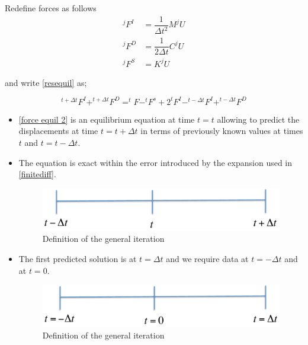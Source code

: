 
Redefine forces as follows
\begin{equation}
\begin{aligned}
^{j}F^I&=\dfrac{1}{\Delta t^2}M ^{j}U\\
^{j}F^D&=\dfrac{1}{2 \Delta t}C ^{j}U\\
^{j}F^S&=K ^{j}U
\end{aligned}
\label{redefine}
\end{equation}

and write \eqref{resequil} as;

\begin{equation}
^{t+\Delta t}F^I+^{t+\Delta t}F^D=^{t}F-^{t}F^s+2 ^{t}F^I-^{t-\Delta t}F^I+^{t-\Delta t}F^D
\label{force equil 2}
\end{equation}

\begin{itemize}
\item \eqref{force equil 2} is an equilibrium equation at time $t=t$ allowing to predict the displacements at time $t=t+\Delta t$ in terms of previously known values at times $t$ and $t=t-\Delta t$.

\item The equation is exact within the error introduced by the expansion used in \eqref{finitediff}.

\begin{figure}[h]
\centering
\includegraphics[width=12cm]{img/figure7_0.pdf}
\caption{Definition of the general iteration}
\label{fig:time iteration}
\end{figure}

\item The first predicted solution is at $t=\Delta t$ and we require data at $t=-\Delta t$ and at $t=0$.

\begin{figure}[h]
\centering
\includegraphics[width=12cm]{img/figure7_1.pdf}
\caption{Definition of the general iteration}
\label{fig:initial time iteration}
\end{figure}

\end{itemize}


